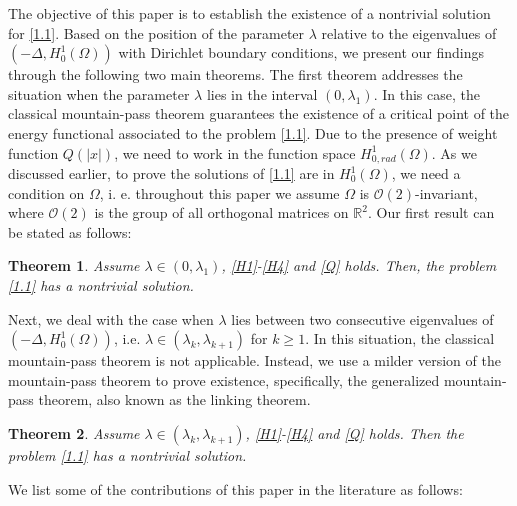 \documentclass[11pt]{amsart}
\numberwithin{equation}{section}
\newtheorem{thm}{Theorem}[section]
\newcommand{\R}{\mathbb{R}}
\newcommand{\h}{H^1_0(\Omega)}
\newcommand{\hr}{H^1_{0, rad}(\Omega)}
\newcommand{\1}{\frac{1}{2}}
\begin{document}
	The objective of this paper is to establish the existence of a nontrivial solution for \eqref{1.1}. Based on the position of the parameter $\lambda$ relative to the eigenvalues of $(-\Delta, \h)$ with Dirichlet boundary conditions, we present our findings through the following two main theorems. The first theorem addresses the situation when the parameter $\lambda$ lies in the interval $(0,\lambda_1)$. In this case, the classical mountain-pass theorem guarantees the existence of a critical point of the energy functional associated to the problem \eqref{1.1}. Due to the presence of weight function $Q(|x|)$,  we need to work in the function space $\hr$. As we discussed earlier, to prove the solutions of \eqref{1.1} are in $\h$, we need a condition on $\Omega$, i. e. throughout this paper we assume $\Omega$  is $\mathcal{O}(2)$-invariant, where $\mathcal{O}(2)$ is the group of all orthogonal matrices on $\R^2$.
	Our first result can be stated as follows:
	\begin{thm} 
		\label{thm1.1}
		Assume $\lambda \in (0,\lambda_1)$, \eqref{H1}-\eqref{H4} and \eqref{Q} holds. Then, the problem \eqref{1.1} has a nontrivial solution.
	\end{thm}	
	Next, we deal with the case when $\lambda$ lies between two consecutive eigenvalues of $(-\Delta, \h)$, i.e. $\lambda\in(\lambda_k, \lambda_{k+1})$ for $k\geq 1$. In this situation, the classical mountain-pass theorem is not applicable. Instead, we use a milder version of the mountain-pass theorem to prove existence, specifically, the generalized mountain-pass theorem, also known as the linking theorem.
	\begin{thm}
		\label{thm1.2}
		Assume $\lambda \in (\lambda_k, \lambda_{k+1})$, \eqref{H1}-\eqref{H4} and \eqref{Q} holds. Then the problem \eqref{1.1} has a nontrivial solution.
	\end{thm}
	We list some of the contributions of this paper in the literature as follows:
\end{document}
